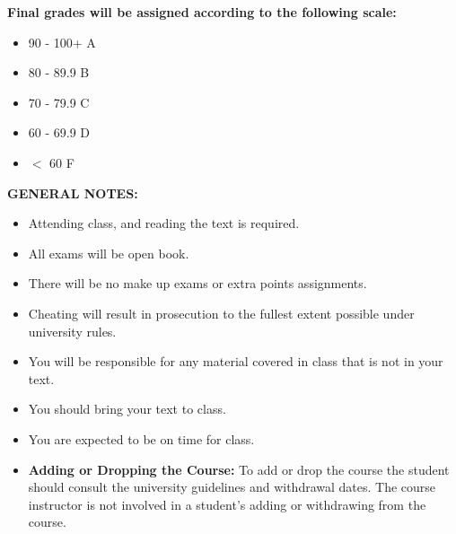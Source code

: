 \documentclass[11pt]{article}
\begin{document}
\begin{center}
\textbf{Final grades will be assigned according to the following scale:}
\end{center}

\begin{itemize}
\item 90 - 100+ A
\item 80 - 89.9 B
\item 70 - 79.9 C
\item 60 - 69.9 D
\item $<$ 60 F
\end{itemize}

\begin{center}
\textbf{GENERAL NOTES:}
\end{center}

\begin{itemize}
\item Attending class, and reading the text is required.
\item All exams will be open book.
\item There will be no make up exams or extra points assignments.
\item Cheating will result in prosecution to the fullest extent possible under university rules.
\item You will be responsible for any material covered in class that is not in your text.
\item You should bring your text to class.
\item You are expected to be on time for class.
\item \textbf{Adding or Dropping the Course:}  To add or drop the course the student should consult the university guidelines and withdrawal dates.  The course instructor is not involved in a student's adding or withdrawing from the course.
\end{itemize}
\end{document}
